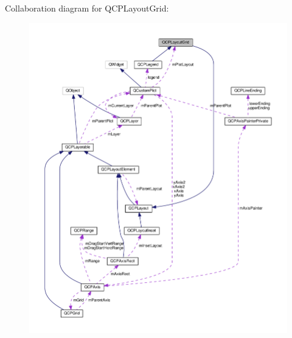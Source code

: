 Collaboration diagram for Q\+C\+P\+Layout\+Grid\+:\nopagebreak
\begin{figure}[H]
\begin{center}
\leavevmode
\includegraphics[width=350pt]{classQCPLayoutGrid__coll__graph}
\end{center}
\end{figure}
